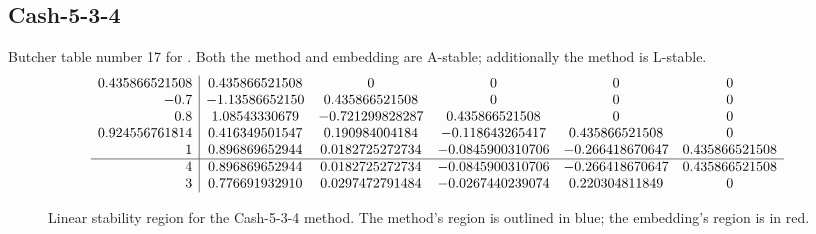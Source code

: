 \documentclass[letterpaper,10pt,english]{sphinxmanual}
\begin{document}
\subsection{Cash-5-3-4}
\label{Butcher:butcher-cash-5-3-4}\label{Butcher:cash-5-3-4}
Butcher table number 17
for {\hyperref[c_interface/User_callable:ARKodeSetIRKTableNum]{}}.  Both the
method and embedding are A-stable; additionally the method is L-stable.
\begin{gather}
\begin{split}\begin{array}{r|ccccc}
  0.435866521508 & 0.435866521508 & 0 & 0 & 0 & 0 \\
  -0.7 & -1.13586652150 & 0.435866521508 & 0 & 0 & 0 \\
  0.8 & 1.08543330679 & -0.721299828287 & 0.435866521508 & 0 & 0 \\
  0.924556761814 & 0.416349501547 & 0.190984004184 & -0.118643265417 & 0.435866521508 & 0 \\
  1 & 0.896869652944 & 0.0182725272734 & -0.0845900310706 & -0.266418670647 & 0.435866521508 \\
  \hline
  4 & 0.896869652944 & 0.0182725272734 & -0.0845900310706 & -0.266418670647 & 0.435866521508 \\
  3 & 0.776691932910 & 0.0297472791484 & -0.0267440239074 & 0.220304811849 & 0
\end{array}\end{split}\notag
\end{gather}\begin{figure}[htbp]
\centering
\capstart

\caption{Linear stability region for the Cash-5-3-4 method.  The method's
region is outlined in blue; the embedding's region is in red.}\end{figure}
\end{document}
